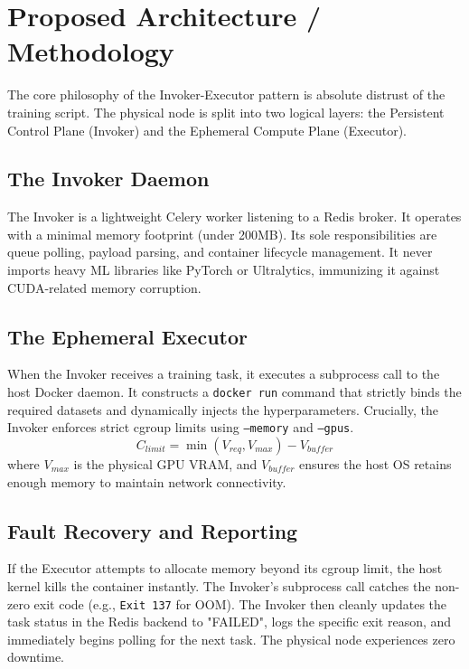 \documentclass[10pt,twocolumn,letterpaper]{article}
\begin{document}
\section{Proposed Architecture / Methodology}
The core philosophy of the Invoker-Executor pattern is absolute distrust of the training script. The physical node is split into two logical layers: the Persistent Control Plane (Invoker) and the Ephemeral Compute Plane (Executor).

\subsection{The Invoker Daemon}
The Invoker is a lightweight Celery worker listening to a Redis broker. It operates with a minimal memory footprint (under 200MB). Its sole responsibilities are queue polling, payload parsing, and container lifecycle management. It never imports heavy ML libraries like PyTorch or Ultralytics, immunizing it against CUDA-related memory corruption.

\subsection{The Ephemeral Executor}
When the Invoker receives a training task, it executes a subprocess call to the host Docker daemon. It constructs a \texttt{docker run} command that strictly binds the required datasets and dynamically injects the hyperparameters. Crucially, the Invoker enforces strict cgroup limits using \texttt{--memory} and \texttt{--gpus}.
\begin{equation}
    C_{limit} = \min(V_{req}, V_{max}) - V_{buffer}
\end{equation}
where $V_{max}$ is the physical GPU VRAM, and $V_{buffer}$ ensures the host OS retains enough memory to maintain network connectivity. 

\begin{figure}[htbp]
\centering
\end{figure}

\subsection{Fault Recovery and Reporting}
If the Executor attempts to allocate memory beyond its cgroup limit, the host kernel kills the container instantly. The Invoker's subprocess call catches the non-zero exit code (e.g., \texttt{Exit 137} for OOM). The Invoker then cleanly updates the task status in the Redis backend to "FAILED", logs the specific exit reason, and immediately begins polling for the next task. The physical node experiences zero downtime.
\end{document}
